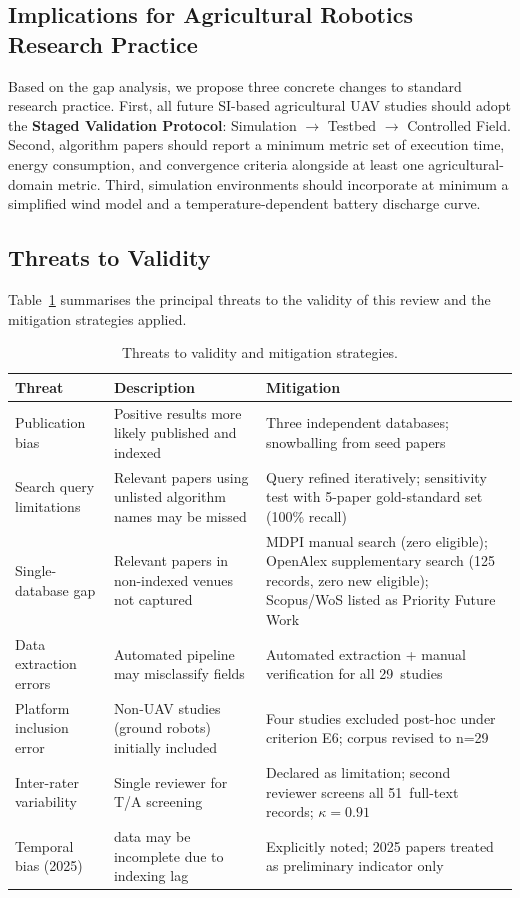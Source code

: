 \documentclass[review,3p]{elsarticle}
\begin{document}
\subsection{Implications for Agricultural Robotics Research Practice}
\label{sec:implications}

Based on the gap analysis, we propose three concrete changes to standard research
practice. First, all future SI-based agricultural UAV studies should adopt the
\textbf{Staged Validation Protocol}: Simulation $\rightarrow$ Testbed $\rightarrow$
Controlled Field. Second, algorithm papers should report a minimum metric set
of execution time, energy consumption, and convergence criteria alongside at
least one agricultural-domain metric. Third, simulation environments should
incorporate at minimum a simplified wind model and a temperature-dependent
battery discharge curve.

\subsection{Threats to Validity}

Table~\ref{tab:threats} summarises the principal threats to the validity of
this review and the mitigation strategies applied.

\begin{table}[p]
\centering
\caption{Threats to validity and mitigation strategies.}
\label{tab:threats}
\small
\begin{tabularx}{\textwidth}{>{\raggedright\arraybackslash}p{3cm}>{\raggedright\arraybackslash}X>{\raggedright\arraybackslash}X}
\toprule
\textbf{Threat} & \textbf{Description} & \textbf{Mitigation} \\
\midrule
Publication bias & Positive results more likely published and indexed & Three independent databases; snowballing from seed papers \\[4pt]
Search query limitations & Relevant papers using unlisted algorithm names may be missed & Query refined iteratively; sensitivity test with 5-paper gold-standard set (100\% recall) \\[4pt]
Single-database gap & Relevant papers in non-indexed venues not captured & MDPI manual search (zero eligible); OpenAlex supplementary search (125 records, zero new eligible); Scopus/WoS listed as Priority Future Work \\[4pt]
Data extraction errors & Automated pipeline may misclassify fields & Automated extraction + manual verification for all 29~studies \\[4pt]
Platform inclusion error & Non-UAV studies (ground robots) initially included & Four studies excluded post-hoc under criterion E6; corpus revised to n=29 \\[4pt]
Inter-rater variability & Single reviewer for T/A screening & Declared as limitation; second reviewer screens all 51~full-text records; $\kappa=0.91$ \\[4pt]
Temporal bias (2025) & 2025 data may be incomplete due to indexing lag & Explicitly noted; 2025 papers treated as preliminary indicator only \\
\bottomrule
\end{tabularx}
\end{table}
\end{document}
